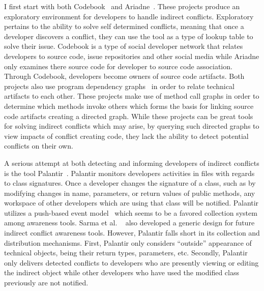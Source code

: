 I first start with both Codebook~\cite{Begel:2010:CDE} and 
Ariadne~\cite{Trainer:2005:BGT}. These projects produce an exploratory
environment for developers to handle indirect conflicts. Exploratory
pertains to the ability to solve self determined conflicts, meaning that
once a developer discovers a conflict, they can use the tool as a type of
lookup table to solve their issue. Codebook is a type of social developer
network that relates developers to source code, issue repositories and
other social media while Ariadne only examines there source code for developer
to source code association. Through Codebook, developers become
owners of source code artifacts. Both projects also use program 
dependency graphs~\cite{Horwitz:1992:UPD}
in order to relate technical artifacts to each other. These projects make 
use of method call graphs in order to 
determine which methods invoke others which forms the basis for 
linking source code artifacts creating a directed graph. While these 
projects can be great tools 
for solving indirect conflicts which may arise, by querying such directed
graphs to view impacts of conflict creating code, they lack the ability to
detect potential conflicts on their own.

A serious attempt at both detecting and informing developers of
indirect conflicts is the tool Palantir~\cite{Sarma:2007:TSA}. Palantir
monitors developers activities in files with regards to class signatures.
Once a developer changes the signature of a class, such as by modifying changes
in name, parameters, or return values of public methods, any workspace
of other developers which are using that class will be notified. Palantir utilizes
a push-based event model~\cite{Fitzpatrick:2002:SPA} which seems to be
a favored collection system among awareness tools. Sarma et al.
~\cite{Sarma:2007:TSA} also
developed a generic design for future indirect conflict awareness tools. 
However, Palantir falls short in its collection and distribution
mechanisms. First, Palantir only considers ``outside'' appearance of technical
objects, being their return types, parameters, etc. Secondly, Palantir 
only delivers
detected conflicts to developers who are presently viewing or editing
the indirect object while other developers who have used the modified 
class previously are not notified.

